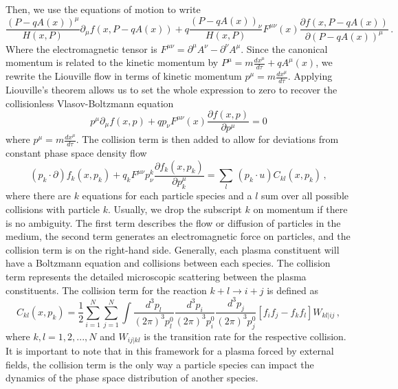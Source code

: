 Then, we use the equations of motion to write
\begin{equation}
    \frac{(P-q A(x))^{\mu}}{H(x,P)} \partial_\mu f(x,P-q A(x)) + q\frac{(P-q A(x))_{\nu}}{H(x,P)} F^{\mu \nu}(x) \frac{\partial f(x,P-q A(x))}{\partial (P-q A(x))^{\mu}}\,.
\end{equation}
Where the electromagnetic tensor is $F^{\mu \nu} = \partial^{\mu} A^{\nu}  - \partial^{\nu}A^{\mu}$. 
Since the canonical momentum is related to the kinetic momentum by $ P^{\mu}  = m\frac{d x^{\mu}}{d \tau} + q A^{\mu}(x)$, we rewrite the Liouville flow in terms of kinetic momentum $p^\mu = m \frac{dx^\mu}{d\tau}$. Applying Liouville's theorem allows us to set the whole expression to zero to recover the collisionless Vlasov-Boltzmann equation
\begin{equation}
    p^{\mu} \partial_\mu f(x, p) + q  p_{\nu} F^{\mu \nu}(x) \frac{\partial f(x, p )}{\partial  p^{\mu} }=0
\end{equation}
where $ p^{\mu} = m\frac{d x^{\mu}}{d \tau}$. The collision term is then added to allow for deviations from constant phase space density flow
\begin{equation}\label{eq:VBE}
\boxed{(p_k \cdot \partial) f_k(x,p_k) + q_k F^{\mu\nu} p^k_\nu \frac{\partial f_k(x,p_k)}{\partial p_k^\mu} =\sum_l \, (p_k\cdot u)C_{kl}(x,p_k)}\,,
\end{equation}
where there are $k$ equations for each particle species and a $l$ sum over all possible collisions with particle $k$. Usually, we drop the subscript $k$ on momentum if there is no ambiguity. The first term describes the flow or diffusion of particles in the medium, the second term generates an electromagnetic force on particles, and the collision term is on the right-hand side. Generally, each plasma constituent will have a Boltzmann equation and collisions between each species. The collision term represents the detailed microscopic scattering between the plasma constituents. The collision term for the reaction $k+l\rightarrow i+j$ is defined as
\begin{equation}\label{eq:collisionMicro}
    C_{kl}(x,p_k) = \frac{1}{2}\sum^N_{i=1}\sum^N_{j=1}\int \frac{d^3p_l}{(2 \pi)^3p_l^0}\frac{d^3p_i}{(2 \pi)^3p_i^0}\frac{d^3p_j}{(2 \pi)^3p_j^0}\left[f_if_j -f_k f_l
    \right]W_{kl|ij}\,,
\end{equation}
where 
$k,l = 1,2,...,N$ and $W_{ij|kl}$ is the transition rate for the respective collision.
It is important to note that in this framework for a plasma forced by external fields, the collision term is the only way a particle species can impact the dynamics of the phase space distribution of another species.


